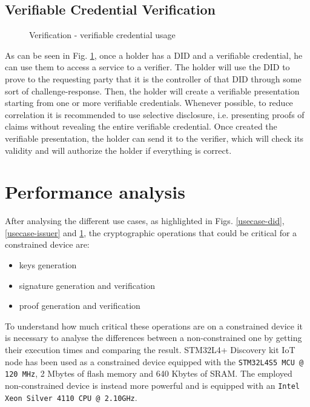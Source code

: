 \subsection{Verifiable Credential Verification}
\begin{figure}[!h]
    \centering
    
    \caption{Verification - verifiable credential usage}
    \label{usecase-verifier}
\end{figure}

As can be seen in Fig. \ref{usecase-verifier}, once a holder has a DID and a verifiable credential, he can use them to access a service to a verifier. The holder will use the DID to prove to the requesting party that it is the controller of that DID through some sort of challenge-response. Then, the holder will create a verifiable presentation starting from one or more verifiable credentials. Whenever possible, to reduce correlation it is recommended to use selective disclosure, i.e. presenting proofs of claims without revealing the entire verifiable credential. Once created the verifiable presentation, the holder can send it to the verifier, which will check its validity and will authorize the holder if everything is correct.  
\section{Performance analysis}
After analysing the different use cases, as highlighted in Figs. \ref{usecase-did}, \ref{usecase-issuer} and \ref{usecase-verifier}, the cryptographic operations that could be  critical for a constrained device are:
\begin{itemize}
    \item keys generation
    \item signature generation and verification
    \item proof generation and verification
\end{itemize}

To understand how much critical these operations are on a constrained device it is necessary to analyse the differences between a non-constrained one by getting their execution times and comparing the result. 
STM32L4+ Discovery kit IoT node\cite{stm32-board-product} has been used as a constrained device equipped with the \texttt{STM32L4S5 MCU @ 120 MHz}, 2 Mbytes of flash memory and 640 Kbytes of SRAM. 
The employed non-constrained device is instead more powerful and is equipped with an \texttt{Intel Xeon Silver 4110 CPU @ 2.10GHz}. 

